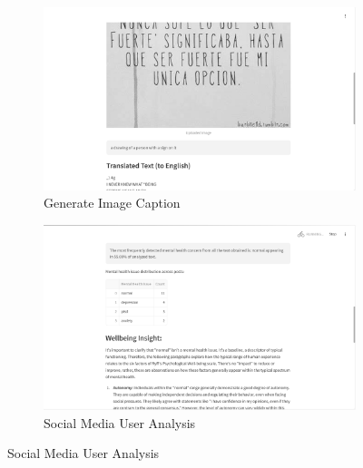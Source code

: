 \begin{figure}[H]
    \centering
    \begin{subfigure}[b]{0.495\textwidth}
        \centering
        \includegraphics[width=\textwidth]{App Images/18 Interface.png}
        \caption{Generate Image Caption}
        \label{fig:10i234}
    \end{subfigure}
    \hfill
    \begin{subfigure}[b]{0.495\textwidth}
        \centering
        \includegraphics[width=\textwidth]{App Images/07 Interface.png}
        \caption{Social Media User Analysis}
        \label{fig:08i}
    \end{subfigure}

    \vspace{1em}


\end{figure}
